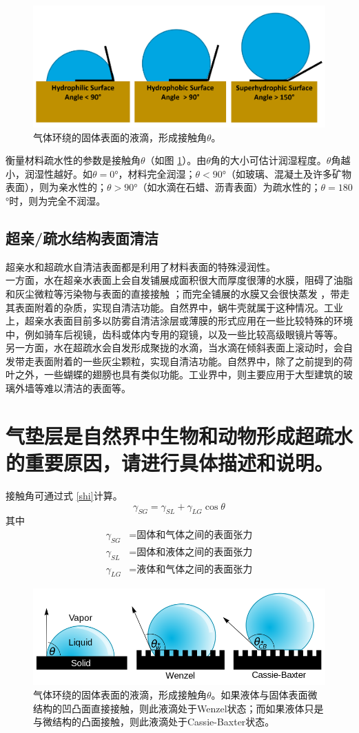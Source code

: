 \documentclass[UTF8,9pt]{ctexart}
\renewcommand\t{\theta}                                                %
\newcommand\se{\section}                                               %
\newcommand\sub{\subsection}                                           %
\begin{document}
\begin{figure}[htbp]
    \centering
    \includegraphics[scale=0.1]{9.png}
    \caption{气体环绕的固体表面的液滴，形成接触角$\t$。}
    \label{ss} 
\end{figure}
衡量材料疏水性的参数是接触角$\t$（如图 \ref{ss}）。由$\t$角的大小可估计润湿程度。$\t$角越小，润湿性越好。如$\t=0$°，材料完全润湿；$\t<90$°（如玻璃、混凝土及许多矿物表面），则为亲水性的；$\t>90$°（如水滴在石蜡、沥青表面）为疏水性的；$\t=180$°时，则为完全不润湿。
\sub{超亲/疏水结构表面清洁}
超亲水和超疏水自清洁表面都是利用了材料表面的特殊浸润性。\\
一方面，水在超亲水表面上会自发铺展成面积很大而厚度很薄的水膜，阻碍了油脂和灰尘微粒等污染物与表面的直接接触 ；而完全铺展的水膜又会很快蒸发 ，带走其表面附着的杂质，实现自清洁功能。自然界中，蜗牛壳就属于这种情况。工业上，超亲水表面目前多以防雾自清洁涂层或薄膜的形式应用在一些比较特殊的环境中，例如骑车后视镜，齿科或体内专用的窥镜，以及一些比较高级眼镜片等等。\\
另一方面，水在超疏水会自发形成聚拢的水滴，当水滴在倾斜表面上滚动时，会自发带走表面附着的一些灰尘颗粒，实现自清洁功能。自然界中，除了之前提到的荷叶之外，一些蝴蝶的翅膀也具有类似功能。工业界中，则主要应用于大型建筑的玻璃外墙等难以清洁的表面等。
\se{气垫层是自然界中生物和动物形成超疏水的重要原因，请进行具体描述和说明。}
接触角可通过式 \ref{shi}计算。
\begin{equation}
\gamma_{S G}=\gamma_{S L}+\gamma_{L G} \cos \theta \label{shi}
\end{equation}
其中
$$ 
\begin{aligned} 
    \gamma_{S G} &=\text{固体和气体之间的表面张力}\\ 
    \gamma_{S L} &=\text{固体和液体之间的表面张力}\\ 
    \gamma_{L G} &=\text{液体和气体之间的表面张力}
\end{aligned}
 $$
 \begin{figure}[htbp]
    \centering
    \includegraphics[scale=0.4]{8.png}
    \caption{气体环绕的固体表面的液滴，形成接触角$\t$。如果液体与固体表面微结构的凹凸面直接接触，则此液滴处于Wenzel状态；而如果液体只是与微结构的凸面接触，则此液滴处于Cassie-Baxter状态。}
     
\end{figure}
\end{document}
